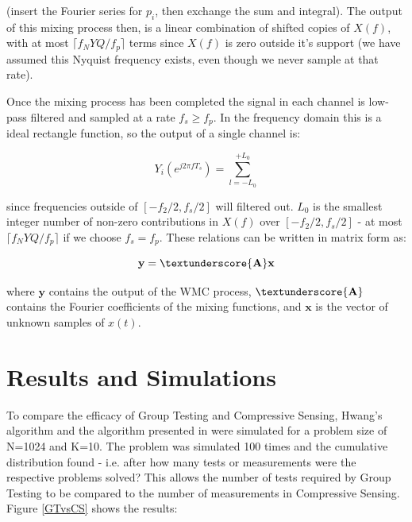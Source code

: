 \documentclass[12pt, a4paper]{article}
\begin{document}
(insert the Fourier series for \(p_i\), then exchange the sum and integral). The output of this mixing process then, is a linear combination of shifted copies of \(X\left(f\right)\), with at most \(\lceil f_NYQ/f_p\rceil\) terms since \(X\left(f\right)\) is zero outside it's support (we have assumed this Nyquist frequency exists, even though we never sample at that rate).

Once the mixing process has been completed the signal in each channel is low-pass filtered and sampled at a rate \(f_s \geq f_p\). In the frequency domain this is a ideal rectangle function, so the output of a single channel is:

\begin{equation}
Y_i\left(e^{j 2 \pi f T_s }\right) = \sum_{l = -L_0}^{+L_0}
\end{equation}

since frequencies outside of \([-f_2/2, f_s/2]\) will filtered out. \(L_0\) is the smallest integer number of non-zero contributions in \(X\left(f\right)\) over \([-f_2/2, f_s/2]\) - at most \(\lceil f_NYQ/f_p\rceil\) if we choose \(f_s = f_p\). These relations can be written in matrix form as:

\begin{equation}
\textbf{y} = \textunderscore{\textbf{A}}\textbf{x}
\end{equation}

where \(\textbf{y}\) contains the output of the WMC process, \(\textunderscore{\textbf{A}}\) contains the Fourier coefficients of the mixing functions, and \(\textbf{x}\) is the vector of unknown samples of \(x\left(t\right)\). 


\section{Results and Simulations}
To compare the efficacy of Group Testing and Compressive Sensing, Hwang's algorithm and the algorithm presented in \cite{Aldrouobi} were simulated for a problem size of N=1024 and K=10.  The problem was simulated 100 times and the cumulative distribution found - i.e. after how many tests or measurements were the respective problems solved? This allows the number of tests required by Group Testing to be compared to the number of measurements in Compressive Sensing. Figure \ref{GTvsCS} shows the results:
\end{document}

